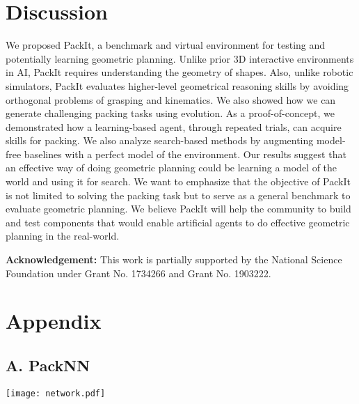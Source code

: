 \documentclass{article}
\begin{document}
\section{Discussion}
We proposed PackIt, a benchmark and virtual environment for testing and potentially learning geometric planning. Unlike prior 3D interactive environments in AI, PackIt requires understanding the geometry of shapes. Also, unlike robotic simulators, PackIt evaluates higher-level geometrical reasoning skills by avoiding orthogonal problems of grasping and kinematics. We also showed how we can generate challenging packing tasks using evolution. As a proof-of-concept, we demonstrated how a learning-based agent, through repeated trials, can acquire skills for packing. We also analyze search-based methods by augmenting model-free baselines with a perfect model of the environment. Our results suggest that an effective way of doing geometric planning could be learning a model of the world and using it for search. We want to emphasize that the objective of PackIt is not limited to solving the packing task but to serve as a general benchmark to evaluate geometric planning. We believe PackIt will help the community to build and test components that would enable artificial agents to do effective geometric planning in the real-world.

\textbf{Acknowledgement: } This work is partially supported by the National Science Foundation under Grant No. 1734266 and Grant No. 1903222.
\clearpage

\section*{Appendix}
\subsection*{A. PackNN}
\begin{strip}
  \newline
  \newline
  \texttt{[image: network.pdf]}
  \label{fig:packnn}
\end{strip}


\end{document}
